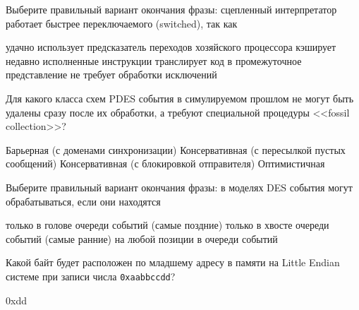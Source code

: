 \documentclass[a4paper, addpoints, answers]{exam}
\begin{document}
\begin{questions}

\question[1] Выберите правильный вариант окончания фразы: сцепленный интерпретатор работает быстрее переключаемого (switched), так как
\begin{choices}
    \correctchoice удачно использует предсказатель переходов хозяйского процессора
    \choice кэширует недавно исполненные инструкции
    \choice транслирует код в промежуточное представление
    \choice не требует обработки исключений
\end{choices}

\question[1] Для какого класса схем PDES события в симулируемом прошлом не могут быть удалены сразу после их обработки, а требуют специальной процедуры <<fossil collection>>?
\begin{choices}
    \choice Барьерная (с доменами синхронизации)
    \choice Консервативная (с пересылкой пустых сообщений)
    \choice Консервативная (с блокировкой отправителя)
    \correctchoice Оптимистичная
\end{choices}


\question[1] Выберите правильный вариант окончания фразы: в моделях DES события могут обрабатываться, если они находятся
\begin{choices}
    \choice только в голове очереди событий (самые поздние)
    \correctchoice только в хвосте очереди событий (самые ранние)
    \choice на любой позиции в очереди событий
\end{choices}

\question[1] Какой байт будет расположен по младшему адресу в памяти на Little Endian системе при записи числа \texttt{0xaabbccdd}?
\begin{solution}[1cm]
0xdd
\end{solution}



\end{questions}
\end{document}
